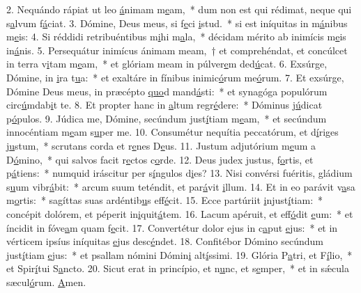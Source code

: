 2. Nequándo rápiat ut leo \uline{á}nimam m\uline{e}am,~* dum non est qui rédimat, neque qui s\uline{a}lvum f\uline{á}ciat.
3. Dómine, Deus meus, si f\uline{e}ci \uline{i}stud.~* si est iníquitas in m\uline{á}nibus m\uline{e}is:
4. Si réddidi retribuéntibus m\uline{i}hi m\uline{a}la,~* décidam mérito ab inimícis m\uline{e}is in\uline{á}nis.
5. Persequátur inimícus ánimam meam,~† et comprehéndat, et concúlcet in terra v\uline{i}tam m\uline{e}am,~* et glóriam meam in púlver\uline{e}m ded\uline{ú}cat.
6. Exsúrge, Dómine, in \uline{i}ra t\uline{u}a:~* et exaltáre in fínibus inimic\uline{ó}rum me\uline{ó}rum.
7. Et exsúrge, Dómine Deus meus, in præcépto \uline{quo}d mand\uline{á}sti:~* et synagóga populórum circ\uline{ú}mdab\uline{i}t te.
8. Et propter hanc in \uline{a}ltum regr\uline{é}dere:~* Dóminus j\uline{ú}dicat p\uline{ó}pulos.
9. Júdica me, Dómine, secúndum just\uline{í}tiam m\uline{e}am,~* et secúndum innocéntiam m\uline{e}am s\uline{u}per me.
10. Consumétur nequítia peccatórum, et d\uline{í}riges j\uline{u}stum,~* scrutans corda et r\uline{e}nes D\uline{e}us.
11. Justum adjutórium m\uline{e}um a D\uline{ó}mino,~* qui salvos facit r\uline{e}ctos c\uline{o}rde.
12. Deus judex justus, f\uline{o}rtis, et p\uline{á}tiens:~* numquid iráscitur per s\uline{í}ngulos d\uline{i}es?
13. Nisi convérsi fuéritis, gládium s\uline{u}um vibr\uline{á}bit:~* arcum suum teténdit, et par\uline{á}vit \uline{i}llum.
14. Et in eo parávit v\uline{a}sa m\uline{o}rtis:~* sagíttas suas ardéntib\uline{u}s eff\uline{é}cit.
15. Ecce partúriit \uline{i}njust\uline{í}tiam:~* concépit dolórem, et péperit in\uline{i}quit\uline{á}tem.
16. Lacum apéruit, et eff\uline{ó}dit \uline{e}um:~* et íncidit in fóve\uline{a}m quam f\uline{e}cit.
17. Convertétur dolor ejus in c\uline{a}put \uline{e}jus:~* et in vérticem ipsíus iníquitas \uline{e}jus desc\uline{é}ndet.
18. Confitébor Dómino secúndum just\uline{í}tiam \uline{e}jus:~* et psallam nómini Dómin\uline{i} alt\uline{í}ssimi.
19. Glória P\uline{a}tri, et F\uline{í}lio,~* et Spir\uline{í}tui S\uline{a}ncto.
20. Sicut erat in princípio, et n\uline{u}nc, et s\uline{e}mper,~* et in sǽcula sæcul\uline{ó}rum. \uline{A}men.

